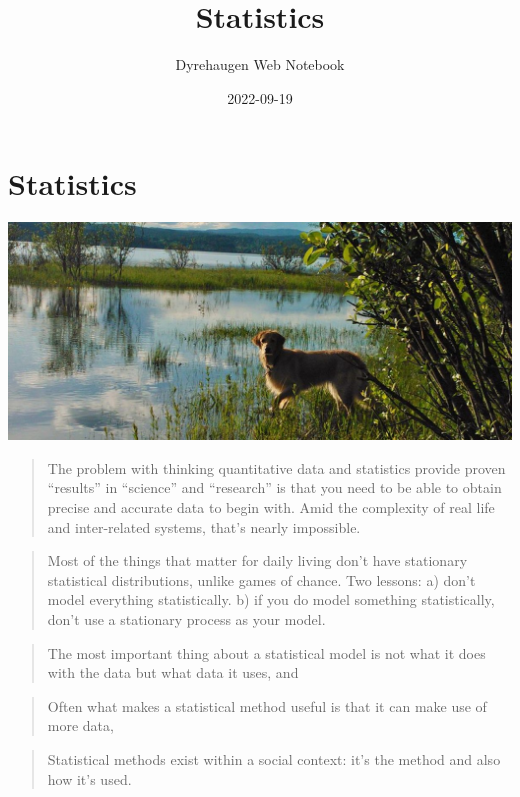 \documentclass[
]{book}
\title{Statistics}
\author{Dyrehaugen Web Notebook}
\date{2022-09-19}
\begin{document}
\maketitle

{
\setcounter{tocdepth}{1}
\tableofcontents
}
\hypertarget{statistics}{%
\chapter{Statistics}\label{statistics}}

\includegraphics{fig/zelda.jpg}

\begin{quote}
The problem with thinking quantitative data and statistics provide proven ``results'' in ``science'' and ``research'' is that you need to be able to obtain precise and accurate data to begin with.
Amid the complexity of real life and inter-related systems, that's nearly impossible.
\end{quote}

\begin{quote}
Most of the things that matter for daily living don't have stationary statistical distributions, unlike games of chance.
Two lessons:
a) don't model everything statistically.
b) if you do model something statistically, don't use a stationary process as your model.
\end{quote}

\begin{quote}
The most important thing about a statistical model is not what it does with the data but what data it uses, and
\end{quote}

\begin{quote}
Often what makes a statistical method useful is that it can make use of more data,
\end{quote}

\begin{quote}
Statistical methods exist within a social context: it's the method and also how it's used.
\end{quote}
\end{document}
